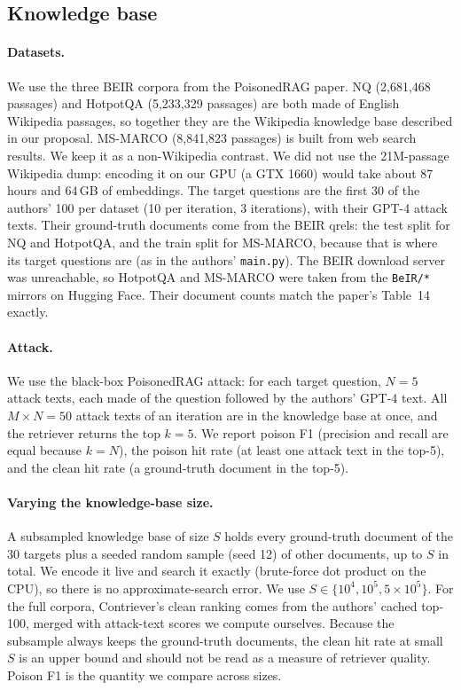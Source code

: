 
\subsection{Knowledge base}

\paragraph{Datasets.}
We use the three BEIR corpora from the PoisonedRAG paper. NQ (2,681,468 passages) and HotpotQA
(5,233,329 passages) are both made of English Wikipedia passages, so together they are the Wikipedia
knowledge base described in our proposal. MS-MARCO (8,841,823 passages) is built from web search results.
We keep it as a non-Wikipedia contrast. We did not use the 21M-passage Wikipedia dump: encoding it on our
GPU (a GTX 1660) would take about 87 hours and 64\,GB of embeddings.
The target questions are the first 30 of the authors' 100 per dataset (10 per iteration, 3 iterations),
with their GPT-4 attack texts. Their ground-truth documents come from the BEIR qrels: the test split for
NQ and HotpotQA, and the train split for MS-MARCO, because that is where its target questions are (as in
the authors' \texttt{main.py}). The BEIR download server was unreachable, so HotpotQA and MS-MARCO were taken from the
\texttt{BeIR/*} mirrors on Hugging Face. Their document counts match the paper's Table~14 exactly.

\paragraph{Attack.}
We use the black-box PoisonedRAG attack: for each target question, $N=5$ attack texts, each made of the
question followed by the authors' GPT-4 text. All $M \times N = 50$ attack texts of an iteration are in the
knowledge base at once, and the retriever returns the top $k=5$. We report poison F1 (precision and recall
are equal because $k=N$), the poison hit rate (at least one attack text in the top-5), and the clean hit rate
(a ground-truth document in the top-5).

\paragraph{Varying the knowledge-base size.}
A subsampled knowledge base of size $S$ holds every ground-truth document of the 30 targets plus a seeded
random sample (seed 12) of other documents, up to $S$ in total. We encode it live and search it exactly
(brute-force dot product on the CPU), so there is no approximate-search error. We use $S \in \{10^4, 10^5,
5\times10^5\}$. For the full corpora, Contriever's clean ranking comes from the authors' cached top-100, merged with
attack-text scores we compute ourselves. Because the subsample always keeps the ground-truth documents, the clean hit
rate at small $S$ is an upper bound and should not be read as a measure of retriever quality. Poison F1 is the
quantity we compare across sizes.

